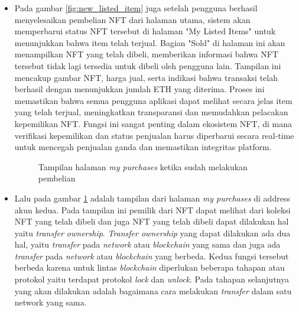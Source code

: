 \begin{itemize}
      \item Pada gambar \ref{fig:new_listed_item} juga setelah pengguna berhasil menyelesaikan pembelian NFT dari halaman utama, sistem akan memperbarui status NFT tersebut di halaman "My Listed Items" untuk menunjukkan bahwa item telah terjual. Bagian "Sold" di halaman ini akan menampilkan NFT yang telah dibeli, memberikan informasi bahwa NFT tersebut tidak lagi tersedia untuk dibeli oleh pengguna lain. Tampilan ini mencakup gambar NFT, harga jual, serta indikasi bahwa transaksi telah berhasil dengan menunjukkan jumlah ETH yang diterima. Proses ini memastikan bahwa semua pengguna aplikasi dapat melihat secara jelas item yang telah terjual, meningkatkan transparansi dan memudahkan pelacakan kepemilikan NFT. Fungsi ini sangat penting dalam ekosistem NFT, di mana verifikasi kepemilikan dan status penjualan harus diperbarui secara real-time untuk mencegah penjualan ganda dan memastikan integritas platform.
    
      \begin{figure} [H] \centering
        \caption{Tampilan halaman \emph{my purchases} ketika sudah melakukan pembelian}
        \label{fig:my_purchases}
        \end{figure}
        \item Lalu pada gambar \ref{fig:my_purchases} adalah tampilan dari halaman \emph{my purchases} di address akun kedua. Pada tampilan ini pemilik dari NFT dapat melihat dari koleksi NFT yang telah dibeli dan juga NFT yang telah dibeli dapat dilakukan hal yaitu \emph{transfer ownership}. \emph{Transfer ownership} yang dapat dilakukan ada dua hal, yaitu \emph{transfer} pada \emph{network} atau \emph{blockchain} yang sama dan juga ada \emph{transfer} pada \emph{network} atau \emph{blockchain} yang berbeda. Kedua fungsi tersebut berbeda karena untuk lintas \emph{blockchain} diperlukan beberapa tahapan atau protokol yaitu terdapat protokol \emph{lock} dan \emph{unlock}. Pada tahapan selanjutnya yang akan dilakukan adalah bagaimana cara melakukan \emph{transfer} dalam satu network yang sama.
        
      \end{itemize}
      
